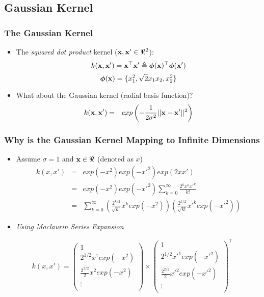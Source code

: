 \documentclass[10pt]{beamer}
\begin{document}
\subsection{Gaussian Kernel}
\begin{frame}
      {
        \frametitle{The Gaussian Kernel}
      }
      \begin{itemize}
      \item The {\em squared dot product} kernel (${\bf x,x'} \in \Re^2$):
        \[
        k({\bf x},{\bf x}') = {\bf x}^\top{\bf x}' \triangleq {\bm \phi}({\bf x})^\top{\bm \phi}({\bf x}')
        \]
        \[
        {\bm \phi}({\bf x}) = \{x_1^2,\sqrt{2}x_1x_2,x_2^2\}
        \]
      \item What about the Gaussian kernel (radial basis function)?
        \begin{eqnarray*}
        k({\bf x},{\bf x}') & = & exp\left(-\frac{1}{2\sigma^2}||{\bf x}-{\bf x}'||^2\right)
        \end{eqnarray*}
      \end{itemize}
\end{frame}
\begin{frame}
      {
        \frametitle{Why is the Gaussian Kernel Mapping to Infinite Dimensions}
      }
      \begin{itemize}
        \item Assume $\sigma = 1$ and ${\bf x} \in \Re$ (denoted as $x$)
        \begin{eqnarray*}
          k(x,x') & = & exp(-x^2)exp(-x'^2)exp(2xx')\\
          & = & exp(-x^2)exp(-x'^2)\sum_{k=0}^\infty\frac{2^kx^kx'^k}{k!}\\
          & = & \sum_{k=0}^\infty\left(\frac{2^{k/2}}{\sqrt{k!}}x^kexp(-x^2)\right)\left(\frac{2^{k/2}}{\sqrt{k!}}x'^kexp(-x'^2)\right)
        \end{eqnarray*}
        \item {\em Using Maclaurin Series Expansion}
      \end{itemize}
      \begin{block}{}
      \[
      k(x,x') = 
      \begin{pmatrix}
        1\\
        2^{1/2}x^1 exp(-x^2)\\
        \frac{2^{2/2}}{2}x^2 exp(-x^2)\\
        \vdots\\
      \end{pmatrix}
      \times
      \begin{pmatrix}
        1\\
        2^{1/2}x'^1 exp(-x'^2)\\
        \frac{2^{2/2}}{2}x'^2 exp(-x'^2)\\
        \vdots\\
      \end{pmatrix}^\top
      \]
      \end{block}
\end{frame}
\end{document}
